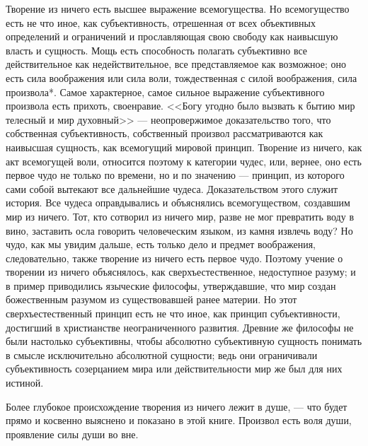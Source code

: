 \documentclass[12pt,oneside]{book}
\begin{document}
Творение из ничего есть высшее выражение всемогущества. Но всемогущество есть не что иное, как субъективность, отрешенная от всех объективных определений и ограничений и прославляющая свою свободу как наивысшую власть и сущность. Мощь есть способность полагать субъективно все действительное как недействительное, все представляемое как возможное; оно есть сила воображения или сила воли, тождественная с силой воображения, сила произвола*\let\svthefootnote\thefootnote\let\thefootnote\relax{}\let\thefootnote\svthefootnote. Самое характерное, самое сильное выражение субъективного произвола есть прихоть, своенравие. <<Богу угодно было вызвать к бытию мир телесный и мир духовный>> --- неопровержимое доказательство того, что собственная субъективность, собственный произвол рассматриваются как наивысшая сущность, как всемогущий мировой принцип. Творение из ничего, как акт всемогущей воли, относится поэтому к категории чудес, или, вернее, оно есть первое чудо не только по времени, но и по значению --- принцип, из которого сами собой вытекают все дальнейшие чудеса. Доказательством этого служит история. Все чудеса оправдывались и объяснялись всемогуществом, создавшим мир из ничего. Тот, кто сотворил из ничего мир, разве не мог превратить воду в вино, заставить осла говорить человеческим языком, из камня извлечь воду? Но чудо, как мы увидим дальше, есть только дело и предмет воображения, следовательно, также творение из ничего есть первое чудо. Поэтому учение о творении из ничего объяснялось, как сверхъестественное, недоступное разуму; и в пример приводились языческие философы, утверждавшие, что мир создан божественным разумом из существовавшей ранее материи. Но этот сверхъестественный принцип есть не что иное, как принцип субъективности, достигший в христианстве неограниченного развития. Древние же философы не были настолько субъективны, чтобы абсолютно субъективную сущность понимать в смысле исключительно абсолютной сущности; ведь они ограничивали субъективность созерцанием мира или действительности мир же был для них истиной.

Более глубокое происхождение творения из ничего лежит в душе, --- что будет прямо и косвенно выяснено и показано в этой книге. Произвол есть воля души, проявление силы души во вне.
\end{document}

